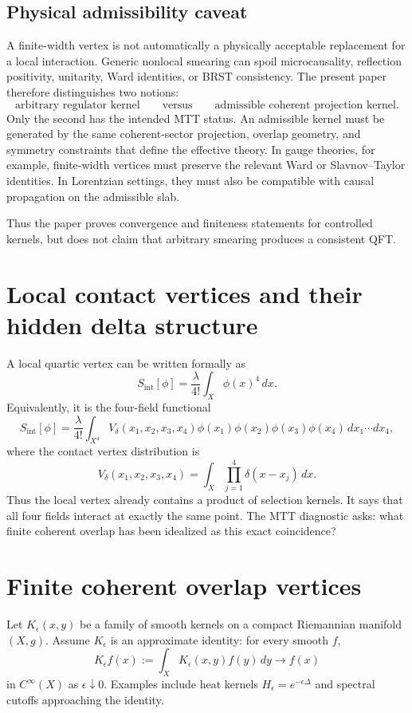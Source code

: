 \documentclass[11pt]{article}
\begin{document}
\subsection{Physical admissibility caveat}

A finite-width vertex is not automatically a physically acceptable replacement for a local
interaction.  Generic nonlocal smearing can spoil microcausality, reflection positivity,
unitarity, Ward identities, or BRST consistency.  The present paper therefore distinguishes
two notions:
\[
\text{arbitrary regulator kernel}
\qquad\text{versus}\qquad
\text{admissible coherent projection kernel}.
\]
Only the second has the intended MTT status.  An admissible kernel must be generated by the
same coherent-sector projection, overlap geometry, and symmetry constraints that define the
effective theory.  In gauge theories, for example, finite-width vertices must preserve the
relevant Ward or Slavnov--Taylor identities.  In Lorentzian settings, they must also be
compatible with causal propagation on the admissible slab.

Thus the paper proves convergence and finiteness statements for controlled kernels, but does
not claim that arbitrary smearing produces a consistent QFT.

\section{Local contact vertices and their hidden delta structure}

A local quartic vertex can be written formally as
\[
S_{\mathrm{int}}[\phi]
=\frac{\lambda}{4!}\int_X \phi(x)^4\,dx .
\]
Equivalently, it is the four-field functional
\[
S_{\mathrm{int}}[\phi]
=
\frac{\lambda}{4!}
\int_{X^4}
V_{\delta}(x_1,x_2,x_3,x_4)
\phi(x_1)\phi(x_2)\phi(x_3)\phi(x_4)
\,dx_1\cdots dx_4,
\]
where the contact vertex distribution is
\[
V_{\delta}(x_1,x_2,x_3,x_4)
=
\int_X
\prod_{j=1}^{4}\delta(x-x_j)\,dx .
\]
Thus the local vertex already contains a product of selection kernels.  It says that all four
fields interact at exactly the same point.  The MTT diagnostic asks: what finite coherent
overlap has been idealized as this exact coincidence?

\section{Finite coherent overlap vertices}

Let \(K_\epsilon(x,y)\) be a family of smooth kernels on a compact Riemannian manifold
\((X,g)\).  Assume \(K_\epsilon\) is an approximate identity: for every smooth \(f\),
\[
K_\epsilon f(x):=\int_X K_\epsilon(x,y)f(y)\,dy\longrightarrow f(x)
\]
in \(C^\infty(X)\) as \(\epsilon\downarrow0\).  Examples include heat kernels
\(H_\epsilon=e^{-\epsilon\Delta}\) and spectral cutoffs approaching the identity.
\end{document}
